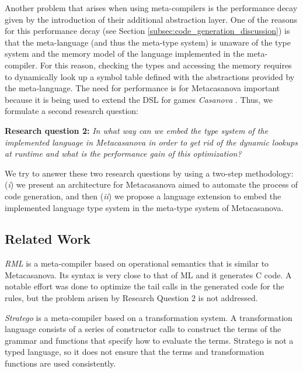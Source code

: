 \vspace{0.2cm}
Another problem that arises when using meta-compilers is the performance decay given by the introduction of their additional abstraction layer. One of the reasons for this performance decay (see Section \ref{subsec:code_generation_discussion}) is that the meta-language (and thus the meta-type system) is unaware of the type system and the memory model of the language implemented in the meta-compiler. For this reason, checking the types and accessing the memory requires to dynamically look up a symbol table defined with the abstractions provided by the meta-language. The need for performance is for Metacasanova important because it is being used to extend the DSL for games \textit{Casanova} \cite{abbadi2015casanova, abbadithesis2017}. Thus, we formulate a second research question:

\vspace{0.2cm}
\noindent
\textbf{Research question 2:} \textit{In what way can we embed the type system of the implemented language in Metacasanova in order to get rid of the dynamic lookups at runtime and what is the performance gain of this optimization?}

\vspace{0.2cm}
We try to answer these two research questions by using a two-step methodology: (\textit{i}) we present an architecture for Metacasanova aimed to automate the process of code generation, and then (\textit{ii}) we propose a language extension to embed the implemented language type system in the meta-type system of Metacasanova.

\subsection{Related Work}
\textit{RML} \cite{pettersson1996compiler} is a meta-compiler based on operational semantics that is similar to Metacasanova. Its syntax is very close to that of ML and it generates C code. A notable effort was done to optimize the tail calls in the generated code for the rules, but the problem arisen by Research Question 2 is not addressed.

\textit{Stratego} \cite{bravenboer2008stratego} is a meta-compiler based on a transformation system. A transformation language consists of a series of constructor calls to construct the terms of the grammar and functions that specify how to evaluate the terms. Stratego is not a typed language, so it does not ensure that the terms and transformation functions are used consistently.

